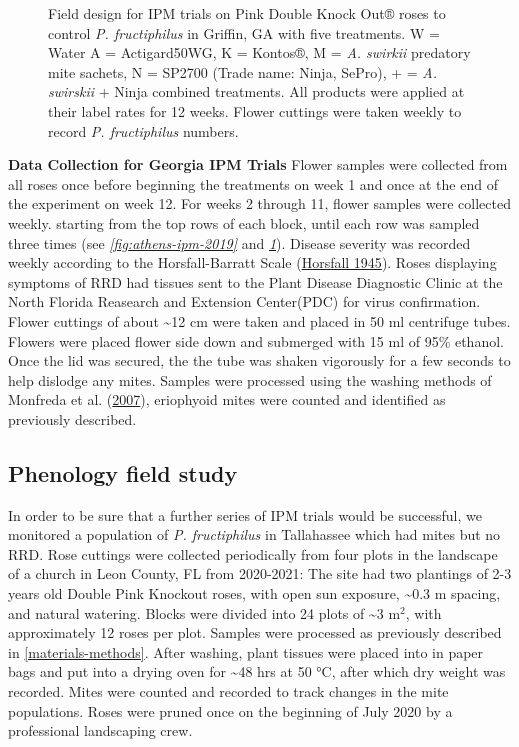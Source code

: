 \documentclass{ufdissertation}[overrideChapters] %
\begin{document}
{\begin{figure}
{}

\caption[Field design for IPM trials on Pink Double Knock Out® roses to control \textit{P. fructiphilus} in Griffin, GA with five treatments]{Field design for IPM trials on Pink Double Knock Out® roses to control \textit{P. fructiphilus} in Griffin, GA with five treatments. W = Water A = Actigard50WG, K = Kontos®, M = \textit{A. swirkii} predatory mite sachets, N = SP2700 (Trade name: Ninja, SePro), + = \textit{A. swirskii} + Ninja combined treatments. All products were applied at their label rates for 12 weeks. Flower cuttings were taken weekly to record \textit{P. fructiphilus} numbers.}\label{fig:griff-ipm-2019}
\end{figure}
\textbf{Data Collection for Georgia IPM Trials}
Flower samples were collected from all roses once before beginning the treatments on week 1 and once at the end of the experiment on week 12. For weeks 2 through 11, flower samples were collected weekly. starting from the top rows of each block, until each row was sampled three times (see \emph{\ref{fig:athens-ipm-2019}} and \emph{\ref{fig:griff-ipm-2019}}). Disease severity was recorded weekly according to the Horsfall-Barratt Scale (\protect\hyperlink{ref-Horsfall1945}{Horsfall 1945}). Roses displaying symptoms of RRD had tissues sent to the Plant Disease Diagnostic Clinic at the North Florida Reasearch and Extension Center(PDC) for virus confirmation. Flower cuttings of about \textasciitilde12 cm were taken and placed in 50 ml centrifuge tubes. Flowers were placed flower side down and submerged with 15 ml of 95\% ethanol. Once the lid was secured, the the tube was shaken vigorously for a few seconds to help dislodge any mites. Samples were processed using the washing methods of Monfreda et al. (\protect\hyperlink{ref-Monfreda2007}{2007}), eriophyoid mites were counted and identified as previously described.

\hypertarget{phenology-field-study}{%
\subsection{Phenology field study}\label{phenology-field-study}}

In order to be sure that a further series of IPM trials would be successful, we monitored a population of \emph{P. fructiphilus} in Tallahassee which had mites but no RRD. Rose cuttings were collected periodically from four plots in the landscape of a church in Leon County, FL from 2020-2021: The site had two plantings of 2-3 years old Double Pink Knockout roses, with open sun exposure, \textasciitilde0.3 \si{\metre} spacing, and natural watering. Blocks were divided into 24 plots of \textasciitilde3 \si{\metre}\(^2\), with approximately 12 roses per plot. Samples were processed as previously described in \ref{materials-methods}. After washing, plant tissues were placed into in paper bags and put into a drying oven for \textasciitilde48 hrs at 50 °C, after which dry weight was recorded. Mites were counted and recorded to track changes in the mite populations. Roses were pruned once on the beginning of July 2020 by a professional landscaping crew.

}
\end{document}
